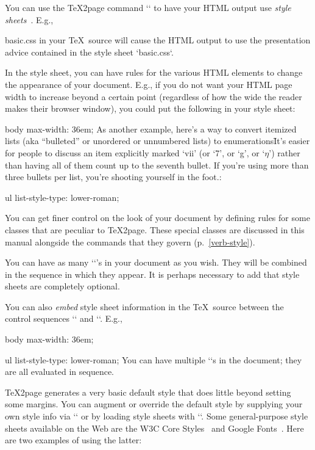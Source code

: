 %
You can use the \TeX2page command `` to have your HTML output use {\em style
sheets}~\cite{w3c:css,lb:css}.  E.g.,

\begintt
\ifx\shipout\UnDeFiNeD %
   basic.css
\fi
\endtt
%
in your \TeX\ source will cause the HTML output to
use the presentation advice contained in the
style sheet `basic.css`.

In the style sheet, you can have rules for the various
HTML elements to change the appearance of your
document.  E.g., if you do not want your HTML page
width to increase beyond a certain point (regardless of
how the wide the reader makes their browser window),
you could put the following in your style sheet:

\begintt
body {
  max-width: 36em;
}
\endtt
As another example, here’s a way to convert itemized lists (aka
“bulleted” or unordered or unnumbered lists) to
enumerations\f{It’s easier for people to discuss an item
explicitly marked ‘vii’ (or ‘7’, or ‘g’, or ‘$\eta$’) rather than
having all of them count up to the seventh bullet. If you’re using
more than three bullets per list, you’re shooting yourself in the
foot.}:

\begintt
ul {
  list-style-type: lower-roman;
}
\endtt

You can get finer control on the look of your document
by defining rules for some classes that are peculiar to
\TeX2page.  These special classes
are discussed in this manual alongside the commands
that they govern (p.~\ref{verb-style}).

You can have as many ``’s in your
document as you wish.  They will be combined in
the sequence in which they appear.  It is perhaps
necessary to add that style sheets are completely
optional.


You can also {\em embed} style sheet information
in the \TeX\ source between the control sequences
`\cssblock` and `\endcssblock`.  E.g.,

\begintt
\ifx\shipout\UnDeFiNeD %
\cssblock
body {
  max-width: 36em;
}

ul {
  list-style-type: lower-roman;
}
\endcssblock
\fi
\endtt
%
You can
have multiple `\cssblock`s in the document; they
are all evaluated in sequence.

\TeX2page generates a very basic default style
that
does little beyond setting some margins.  You
can augment or override the default style by supplying your
own style info via `\cssblock` or by loading
style sheets with ``.   Some general-purpose
style sheets available on the Web are the W3C Core
Styles~\cite{w3ccorestyles} and Google Fonts~\cite{googlefonts}.
Here are two examples of using the latter:


